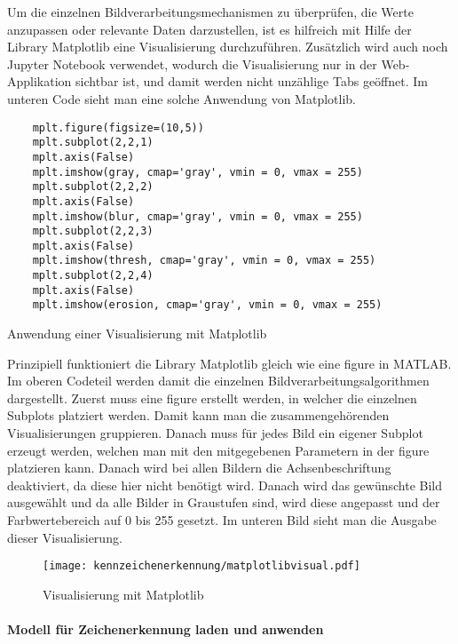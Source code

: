 Um die einzelnen Bildverarbeitungsmechanismen zu überprüfen, die Werte anzupassen oder relevante Daten darzustellen, ist es hilfreich mit Hilfe der Library 
Matplotlib eine Visualisierung durchzuführen. Zusätzlich wird auch noch Jupyter Notebook verwendet, wodurch die Visualisierung nur in der Web-Applikation 
sichtbar ist, und damit werden nicht unzählige Tabs geöffnet. Im unteren Code sieht man eine solche Anwendung von Matplotlib.

\begin{listing}[H]
    \begin{verbatim}
    mplt.figure(figsize=(10,5))
    mplt.subplot(2,2,1)
    mplt.axis(False)
    mplt.imshow(gray, cmap='gray', vmin = 0, vmax = 255) 
    mplt.subplot(2,2,2)
    mplt.axis(False)
    mplt.imshow(blur, cmap='gray', vmin = 0, vmax = 255)
    mplt.subplot(2,2,3)
    mplt.axis(False)
    mplt.imshow(thresh, cmap='gray', vmin = 0, vmax = 255)
    mplt.subplot(2,2,4)
    mplt.axis(False)
    mplt.imshow(erosion, cmap='gray', vmin = 0, vmax = 255)
    \end{verbatim}
    \caption{Anwendung einer Visualisierung mit Matplotlib}
\end{listing}

Prinzipiell funktioniert die Library Matplotlib gleich wie eine figure in MATLAB. Im oberen Codeteil werden damit die einzelnen Bildverarbeitungsalgorithmen 
dargestellt. Zuerst muss eine figure erstellt werden, in welcher die einzelnen Subplots platziert werden. Damit kann man die zusammengehörenden Visualisierungen 
gruppieren. Danach muss für jedes Bild ein eigener Subplot erzeugt werden, welchen man mit den mitgegebenen Parametern in der figure platzieren kann. Danach 
wird bei allen Bildern die Achsenbeschriftung deaktiviert, da diese hier nicht benötigt wird. Danach wird das gewünschte Bild ausgewählt und da alle Bilder in 
Graustufen sind, wird diese angepasst und der Farbwertebereich auf 0 bis 255 gesetzt. Im unteren Bild sieht man die Ausgabe dieser Visualisierung.

\begin{figure}[H]
    \centering
    \texttt{[image: kennzeichenerkennung/matplotlibvisual.pdf]}
    \caption{Visualisierung mit Matplotlib}
\end{figure}

\paragraph{Modell für Zeichenerkennung laden und anwenden}\mbox{}\\

